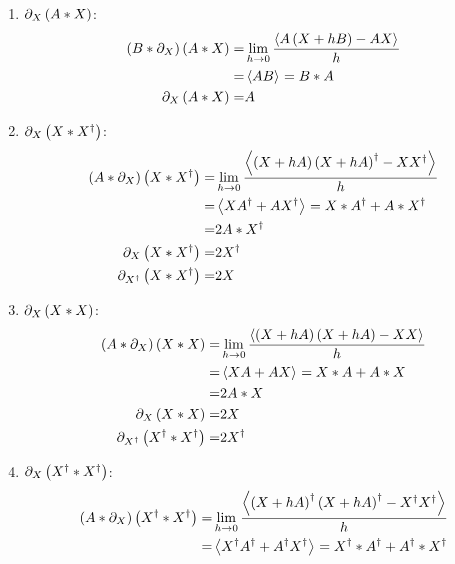 \begin{enumerate}
\item $\partial_{X}\left ( {A*X} \right )$:
	\begin{align}
		\left ( {B*\partial_{X}} \right )\left ( {A*X} \right ) =& \lim_{h\rightarrow 0}\displaystyle\frac{\left < {A\left ( {X+hB} \right )-AX} \right >_{}}{h} \nonumber \\
		                                  =& \left < {AB} \right >_{} = B*A \nonumber \\
		\partial_{X}\left ( {A*X} \right ) =& A  \label{eq6_44a}                
	\end{align}
\item $\partial_{X}\left ( {X*X^{\dagger}} \right )$:
	\begin{align}
		\left ( {A*\partial_{X}} \right )\left ( {X*X^{\dagger}} \right ) =& \lim_{h\rightarrow 0}\displaystyle\frac{\left < {\left ( {X+hA} \right )\left ( {X+hA} \right )^{\dagger}-XX^{\dagger}} \right >_{}}{h}
		                                          \nonumber \\
		                                  =& \left < {XA^{\dagger}+AX^{\dagger}} \right >_{} = X*A^{\dagger}+A*X^{\dagger} \nonumber \\
		                                  =& 2A*X^{\dagger} \label{6_45a} \\
		\partial_{X}\left ( {X*X^{\dagger}} \right ) =&  2X^{\dagger} \label{eq6_46a} \\
		\partial_{X^{\dagger}}\left ( {X*X^{\dagger}} \right ) =&  2X \label{eq6_47a}		              
	\end{align}
\item $\partial_{X}\left ( {X*X} \right )$:
	\begin{align}
		\left ( {A*\partial_{X}} \right )\left ( {X*X} \right ) =& \lim_{h\rightarrow 0}\displaystyle\frac{\left < {\left ( {X+hA} \right )\left ( {X+hA} \right )-XX} \right >_{}}{h}
		                                          \nonumber \\
		                                  =& \left < {XA+AX} \right >_{} = X*A+A*X \nonumber \\
		                                  =& 2A*X \nonumber \\
		\partial_{X}\left ( {X*X} \right ) =&  2X \label{eq6_48a}\\
		\partial_{X^{\dagger}}\left ( {X^{\dagger}*X^{\dagger}} \right ) =&  2X^{\dagger} \label{eq6_49a}
	\end{align}
\item $\partial_{X}\left ( {X^{\dagger}*X^{\dagger}} \right )$:
	\begin{align}
		\paren{A*\partial_{X}}\paren{X^{\R}*X^{\R}} =& \lim_{h\rightarrow 0}\bfrac{\grade{\paren{X+hA}^{\R}
		                                            \paren{X+hA}^{\R}-X^{\R}X^{\R}}{}}{h} \nonumber \\
		                                  =& \grade{X^{\R}A^{\R}+A^{\R}X^{\R}}{} = X^{\R}*A^{\R}+A^{\R}*X^{\R} \nonumber \\

\end{align}
\end{enumerate}
